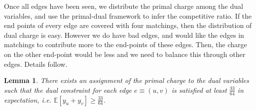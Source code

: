 \documentclass[11pt]{article}
\newtheorem{lemma}[theorem]{Lemma}
\begin{document}

Once all edges have been seen, we distribute the  primal charge among the dual variables, and use the primal-dual framework to infer the competitive ratio. If the end points of every edge are covered with four matchings, then the distribution of dual charge is easy. However we do have bad edges, and would like the edges in matchings to contribute more to the end-points of these edges. Then, the charge on the other end-point would be less and we need to balance this through other edges. Details follow.
\begin{lemma}\label{tree1}
There exists an assignment of the primal charge to the dual variables such that the dual constraint for each edge $e\equiv (u,v)$ is satisfied at least $\frac{33}{64}$ in expectation, i.e. $\mathbb{E}[y_u+y_v]\geq \frac{33}{64}$.
 \end{lemma}
 
\end{document}
